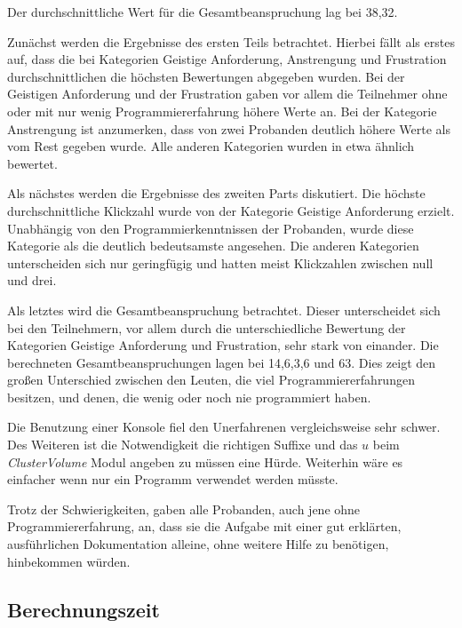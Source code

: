 Der durchschnittliche Wert für die Gesamtbeanspruchung lag bei 38,32. 


Zunächst werden die Ergebnisse des ersten Teils betrachtet. Hierbei fällt als erstes auf, dass die bei Kategorien Geistige Anforderung, Anstrengung und Frustration durchschnittlichen die höchsten Bewertungen abgegeben wurden.
\newline
Bei der Geistigen Anforderung und der Frustration gaben vor allem die Teilnehmer ohne oder mit nur wenig Programmiererfahrung höhere Werte an. Bei der Kategorie Anstrengung ist anzumerken, dass von zwei Probanden deutlich höhere Werte als vom Rest gegeben wurde.
\newline
Alle anderen Kategorien wurden in etwa ähnlich bewertet.


Als nächstes werden die Ergebnisse des zweiten Parts diskutiert. Die höchste durchschnittliche Klickzahl wurde von der Kategorie Geistige Anforderung erzielt. Unabhängig von den Programmierkenntnissen der Probanden, wurde diese Kategorie als die deutlich bedeutsamste angesehen.
\newline
Die anderen Kategorien unterscheiden sich nur geringfügig und hatten meist Klickzahlen zwischen null und drei.


Als letztes wird die Gesamtbeanspruchung betrachtet. Dieser unterscheidet sich bei den Teilnehmern, vor allem durch die unterschiedliche Bewertung der Kategorien Geistige Anforderung und Frustration, sehr stark von einander.
\newline
Die berechneten Gesamtbeanspruchungen lagen bei 14,6,3,6 und 63. Dies zeigt den großen Unterschied zwischen den Leuten, die viel Programmiererfahrungen besitzen, und denen, die wenig oder noch nie programmiert haben.


Die Benutzung einer Konsole fiel den Unerfahrenen vergleichsweise sehr schwer. Des Weiteren ist die Notwendigkeit die richtigen Suffixe und das $u$ beim \textit{ClusterVolume} Modul angeben zu müssen eine Hürde. Weiterhin wäre es einfacher wenn nur ein Programm verwendet werden müsste.

 
Trotz der Schwierigkeiten, gaben alle Probanden, auch jene ohne Programmiererfahrung, an, dass sie die Aufgabe mit einer gut erklärten, ausführlichen Dokumentation alleine, ohne weitere Hilfe zu benötigen, hinbekommen würden.

\newpage
\subsection{Berechnungszeit}

